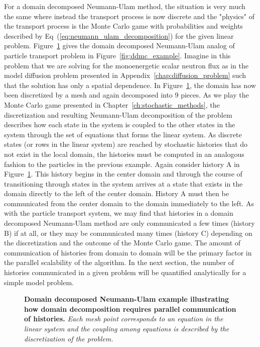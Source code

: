 For a domain decomposed Neumann-Ulam method, the situation is very
much the same where instead the transport process is now discrete and
the "physics" of the transport process is the Monte Carlo game with
probabilities and weights described by
Eq~(\ref{eq:neumann_ulam_decomposition}) for the given linear
problem. Figure~\ref{fig:ddnu_example} gives the domain decomposed
Neumann-Ulam analog of particle transport problem in
Figure~\ref{fig:ddmc_example}. Imagine in this problem that we are
solving for the monoenergetic scalar neutron flux as in the model
diffusion problem presented in Appendix~\ref{chap:diffusion_problem}
such that the solution has only a spatial dependence. In
Figure~\ref{fig:ddnu_example}, the domain has now been discretized by
a mesh and again decomposed into 9 pieces. As we play the Monte Carlo
game presented in Chapter~\ref{ch:stochastic_methods}, the
discretization and resulting Neumann-Ulam decomposition of the problem
describes how each state in the system is coupled to the other states
in the system through the set of equations that forms the linear
system. As discrete states (or rows in the linear system) are reached
by stochastic histories that do not exist in the local domain, the
histories must be computed in an analogous fashion to the particles in
the previous example. Again consider history A in
Figure~\ref{fig:ddnu_example}. This history begins in the center
domain and through the course of transitioning through states in the
system arrives at a state that exists in the domain directly to the
left of the center domain. History A must then be communicated from
the center domain to the domain immediately to the left. As with the
particle transport system, we may find that histories in a domain
decomposed Neumann-Ulam method are only communicated a few times
(history B) if at all, or they may be communicated many times (history
C) depending on the discretization and the outcome of the Monte Carlo
game. The amount of communication of histories from domain to domain
will be the primary factor in the parallel scalability of the
algorithm. In the next section, the number of histories communicated in a given
problem will be quantified analytically for a simple model problem.

\begin{figure}[t!]
  \begin{center}
    \scalebox{1.5}{
       }
  \end{center}
  \caption{\textbf{Domain decomposed Neumann-Ulam example illustrating
      how domain decomposition requires parallel communication of
      histories.} \textit{Each mesh point corresponds to an equation
      in the linear system and the coupling among equations is
      described by the discretization of the problem.}}
  \label{fig:ddnu_example}
\end{figure}

